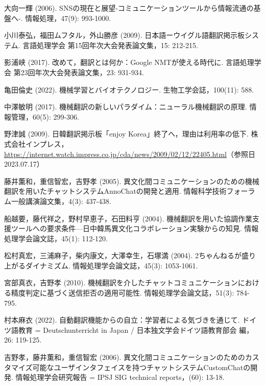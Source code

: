 \documentclass[b5paper,12pt,dvipdfmx]{jsreport}
\begin{document}
\begin{thebibliography}{99}

大向一輝 (2006). SNSの現在と展望-コミュニケーションツールから情報流通の基盤へ-. 情報処理，47(9): 993-1000.

小川泰弘，福田ムフタル，外山勝彦 (2009). 日本語ーウイグル語翻訳掲示板システム. 言語処理学会 第15回年次大会発表論文集，15: 212-215.

影浦峡 (2017). 改めて，翻訳とは何か：Google NMTが使える時代に. 言語処理学会 第23回年次大会発表論文集，23: 931-934.

亀田倫史 (2022). 機械学習とバイオテクノロジー. 生物工学会誌，100(11): 588.

中澤敏明 (2017). 機械翻訳の新しいパラダイム：ニューラル機械翻訳の原理. 情報管理，60(5): 299-306.

野津誠 (2009). 日韓翻訳掲示板「enjoy Korea」終了へ，理由は利用率の低下. 株式会社インプレス，\url{https://internet.watch.impress.co.jp/cda/news/2009/02/12/22405.html}（参照日2023.07.17）

藤井薫和，重信智宏，吉野孝 (2005). 異文化間コミュニケーションのための機械翻訳を用いたチャットシステムAnnoChatの開発と適用. 情報科学技術フォーラム一般講演論文集，4(3): 437-438.

船越要，藤代祥之，野村早恵子，石田料亨 (2004). 機械翻訳を用いた協調作業支援ツールへの要求条件—日中韓馬異文化コラボレーション実験からの知見. 情報処理学会論文誌，45(1): 112-120.

松村真宏，三浦麻子，柴内康文，大澤幸生，石塚満 (2004). 2ちゃんねるが盛り上がるダイナミズム. 情報処理学会論文誌，45(3): 1053-1061.


宮部真衣，吉野孝 (2010). 機械翻訳を介したチャットコミュニケーションにおける精度判定に基づく送信拒否の適用可能性. 情報処理学会論文誌，51(3): 784-795.

村本麻衣 (2022). 自動翻訳機能からの自立：学習者による気づきを通じて. ドイツ語教育 = Deutschunterricht in Japan / 日本独文学会ドイツ語教育部会 編，26: 119-125.

吉野孝，藤井薫和，重信智宏 (2006). 異文化間コミュニケーションのためのカスタマイズ可能なユーザインタフェイスを持つチャットシステムCustomChatの開発. 情報処理学会研究報告 = IPSJ SIG technical reports，(60): 13-18.


\end{thebibliography}
\end{document}
